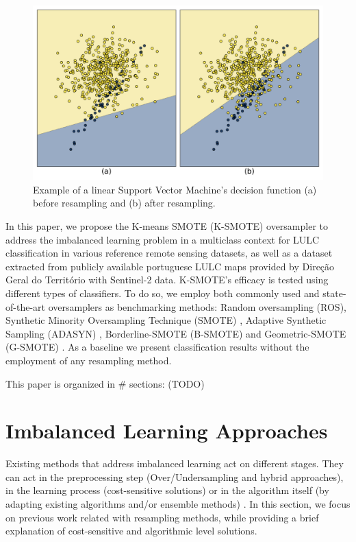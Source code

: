 \documentclass[parskip=full]{scrartcl}
\begin{document}
\begin{figure}[H]
	\centering
	\includegraphics[width=.75\linewidth]{../analysis/oversampling_decision_function}
	\caption{Example of a linear Support Vector Machine's decision function (a) before
		resampling and (b) after resampling.}
	\label{fig:oversampling_decision_function}
\end{figure}

In this paper, we propose the K-means SMOTE (K-SMOTE) \cite{Douzas2018}
oversampler to address the imbalanced learning problem in a multiclass context
for LULC classification in various reference remote sensing datasets, as well
as a dataset extracted from publicly available portuguese LULC maps provided by
Direção Geral do Território with Sentinel-2 data. K-SMOTE's efficacy is tested
using different types of classifiers. To do so, we employ both commonly used
and state-of-the-art oversamplers as benchmarking methods: Random oversampling
(ROS), Synthetic Minority Oversampling Technique (SMOTE)
\cite{Chawla2002}, Adaptive Synthetic Sampling (ADASYN)
\cite{HaiboHe2008}, Borderline-SMOTE (B-SMOTE) \cite{Han2005} and
Geometric-SMOTE (G-SMOTE) \cite{Douzas2019}. As a baseline we present
classification results without the employment of any resampling method.


This paper is organized in \# sections: (TODO)

\section{Imbalanced Learning Approaches}

Existing methods that address imbalanced learning act on different stages. They
can act in the preprocessing step (Over/Undersampling and hybrid approaches),
in the learning process (cost-sensitive solutions) or in the algorithm itself
(by adapting existing algorithms and/or ensemble methods)
\cite{Kaur2019}. In this section, we focus on previous work related with
resampling methods, while providing a brief explanation of cost-sensitive and
algorithmic level solutions.
\end{document}
